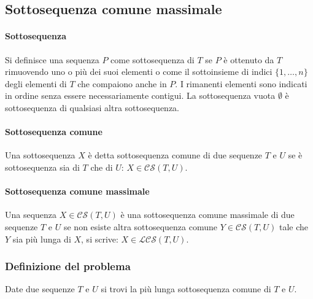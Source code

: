 \subsection{Sottosequenza comune massimale}
\paragraph{Sottosequenza}
Si definisce una sequenza $P$ come sottosequenza di $T$ se $P$ \`e ottenuto da $T$ rimuovendo uno o pi\`u dei suoi elementi o come il sottoinsieme di indici
$\{1, \dots, n\}$ degli elementi di $T$ che compaiono anche in $P$. I rimanenti elementi sono indicati in ordine senza essere necessariamente contigui. La
sottosequenza vuota $\emptyset$ \`e sottosequenza di qualsiasi altra sottosequenza. 
\paragraph{Sottosequenza comune}
Una sottosequenza $X$ \`e detta sottosequenza comune di due sequenze $T$ e $U$ se \`e sottosequenza sia di $T$ che di $U$: $X\in \mathcal{CS}(T, U)$.
\paragraph{Sottosequenza comune massimale}
Una sequenza $X\in \mathcal{CS}(T, U)$ \`e una sottosequenza comune massimale di due sequenze $T$ e $U$ se non esiste altra sottosequenza comune $Y\in 
\mathcal{CS}(T, U)$ tale che $Y$ sia pi\`u lunga di $X$, si scrive: $X\in \mathcal{LCS}(T, U)$.
\subsubsection{Definizione del problema}
Date due sequenze $T$ e $U$ si trovi la pi\`u lunga sottosequenza comune di $T$ e $U$. 

